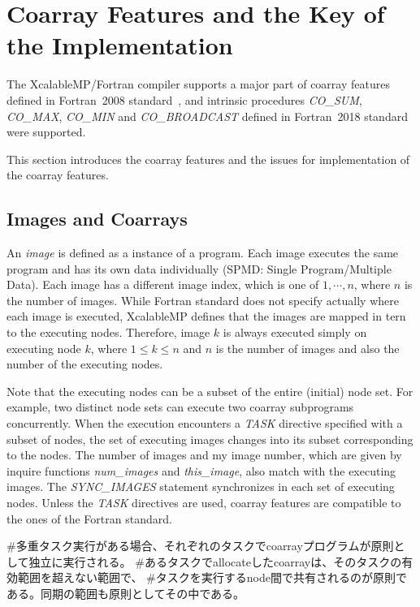 \section{Coarray Features and the Key of the Implementation}\label{sec:lang}

The XcalableMP/Fortran compiler supports a major part of coarray features defined in 
Fortran~2008 standard~\cite{F08}, and intrinsic procedures 
{\em CO\_SUM}, {\em CO\_MAX}, {\em CO_MIN} and {\em CO_BROADCAST} defined in 
Fortran~2018 standard~\cite{F18} were supported.

This section introduces the coarray features and the issues for implementation of 
the coarray features.

\subsection{Images and Coarrays}
An {\em image} is defined as a instance of a program. 
Each image executes the same program and has its own data individually 
(SPMD: Single Program/Multiple Data).
Each image has a different image index, which is one of $1, \cdots, n$, 
where $n$ is the number of images. 
While Fortran standard does not specify actually where each image is executed, 
XcalableMP defines that the images are mapped in tern to the executing nodes. 
Therefore, image $k$ is always executed simply on executing node $k$, 
where $1 \leq k \leq n$ and 
$n$ is the number of images and also the number of the executing nodes. 

Note that the executing nodes can be a subset of the entire (initial) node set. 
For example, two distinct node sets can execute two coarray subprograms concurrently.
When the execution encounters a {\em TASK} directive specified with a subset of nodes,
the set of executing images changes into its subset corresponding to the nodes.
The number of images and my image number, which are given by inquire functions
{\em num\_images} and {\em this\_image}, also match with the executing images.
The {\em SYNC\_IMAGES} statement synchronizes in each set of executing nodes.
Unless the {\em TASK} directives are used, coarray features are 
compatible to the ones of the Fortran standard. 

#多重タスク実行がある場合、それぞれのタスクでcoarrayプログラムが原則として独立に実行される。
#あるタスクでallocateしたcoarrayは、そのタスクの有効範囲を超えない範囲で、
#タスクを実行するnode間で共有されるのが原則である。同期の範囲も原則としてその中である。


